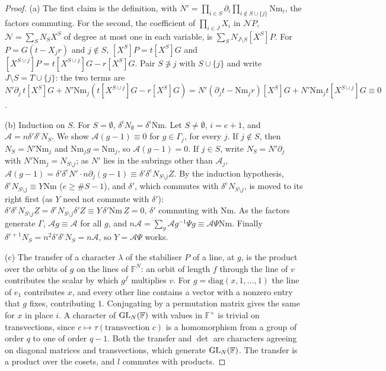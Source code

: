 \begin{proof}
(a) The first claim is the definition, with $N'=\prod_{i\in S}\partial_i\prod_{i\notin S\cup\{j\}}\mathrm{Nm}_i$, the factors commuting. For the second, the coefficient of $\prod_{i\in J}X_i$ in $\mathcal N P$, $\mathcal N=\sum_SN_SX^S$ of degree at most one in each variable, is
$\sum_SN_{J\setminus S}[X^S]P$. For $P=G(t-X_jr)$ and $j\notin S$, $[X^S]P=t[X^S]G$ and $[X^{S\cup j}]P=t[X^{S\cup j}]G-r[X^S]G$. Pair $S\not\ni j$ with $S\cup\{j\}$ and write $J\setminus S=T\cup\{j\}$: the two terms are
$N'\partial_j\,t[X^S]G+N'\mathrm{Nm}_j(t[X^{S\cup j}]G-r[X^S]G)=N'(\partial_jt-\mathrm{Nm}_jr)[X^S]G+N'\mathrm{Nm}_jt[X^{S\cup j}]G\equiv0$.

(b) Induction on $S$. For $S=\emptyset$, $\delta^iN_\emptyset=\delta^i\mathrm{Nm}$. Let $S\ne\emptyset$, $i=e+1$, and $\mathcal A=n\delta'\delta^eN_S$. We show $\mathcal A(g-1)\equiv0$ for $g\in\Gamma_j$, for every $j$. If $j\notin S$, then $N_S=N'\mathrm{Nm}_j$ and
$\mathrm{Nm}_jg=\mathrm{Nm}_j$, so $\mathcal A(g-1)=0$. If $j\in S$, write $N_S=N'\partial_j$ with $N'\mathrm{Nm}_j=N_{S\setminus j}$; as $N'$ lies in the subrings other than $\mathcal A_j$, $\mathcal A(g-1)=\delta'\delta^eN'\cdot n\partial_j(g-1)\equiv\delta'\delta^eN_{S\setminus j}Z$. By the induction
hypothesis, $\delta^eN_{S\setminus j}\equiv Y\mathrm{Nm}$ ($e\ge\#S-1$), and $\delta'$, which commutes with $\delta^eN_{S\setminus j}$, is moved to its right first (as $Y$ need not commute with $\delta'$): $\delta'\delta^eN_{S\setminus j}Z=\delta^eN_{S\setminus j}\delta'Z\equiv Y\,\delta'\mathrm{Nm}\,Z=0$, $\delta'$
commuting with $\mathrm{Nm}$. As the factors generate $\Gamma$, $\mathcal Ag\equiv\mathcal A$ for all $g$, and $n\mathcal A=\sum_g\mathcal Ag^{-1}\Psi g\equiv\mathcal A\Psi\mathrm{Nm}$. Finally $\delta^{e+1}N_S=n^2\delta'\delta^eN_S=n\mathcal A$, so $Y=\mathcal A\Psi$ works.

(c) The transfer of a character $\lambda$ of the stabiliser $P$ of a line, at $g$, is the product over the orbits of $g$ on the lines of $\mathbb F^N$: an orbit of length $f$ through the line of $v$ contributes the scalar by which $g^f$ multiplies $v$. For
$g=\mathrm{diag}(x,1,\dots,1)$ the line of $e_1$ contributes $x$, and every other line contains a vector with a nonzero entry that $g$ fixes, contributing $1$. Conjugating by a permutation matrix gives the same for $x$ in place $i$. A
character of $\operatorname{GL}_N(\mathbb F)$ with values in $\mathbb F^\times$ is trivial on transvections, since $c\mapsto\tau(\text{transvection }c)$ is a homomorphism from a group of order $q$ to one of order $q-1$. Both the transfer and $\det$ are characters
agreeing on diagonal matrices and transvections, which generate $\operatorname{GL}_N(\mathbb F)$. The transfer is a product over the cosets, and $l$ commutes with products.


\end{proof}
